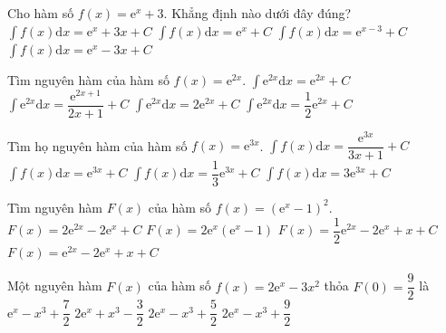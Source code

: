 \begin{ex}
	Cho hàm số $f(x)=\mathrm{e}^x+3$. Khẳng định nào dưới đây đúng?
	\choice 
	{\True $\displaystyle\int f(x) \mathrm{ d} x=\mathrm{e}^x+3 x+C$}
	{$\displaystyle\int f(x) \mathrm{ d} x=\mathrm{e}^x+C$}
	{$\displaystyle\int f(x) \mathrm{ d} x=\mathrm{e}^{x-3}+C$}
	{ $\displaystyle \int f(x) \mathrm{ d} x=\mathrm{e}^x-3 x+C$}
\end{ex}

\begin{ex}
	Tìm nguyên hàm của hàm số $f(x)=\mathrm{e}^{2x}$.
	\choice
	{$\displaystyle \int{\mathrm{e}^{2x}\mathrm{d}x}=\mathrm{e}^{2x}+C$}
	{$\displaystyle \int{\mathrm{e}^{2x}\mathrm{d}x}=\dfrac{\mathrm{e}^{2x+1}}{2x+1}+C$}
	{$\displaystyle \int{\mathrm{e}^{2x}\mathrm{d}x}=2\mathrm{e}^{2x}+C$}
	{\True $\displaystyle \int{\mathrm{e}^{2x}\mathrm{d}x}=\dfrac{1}{2}\mathrm{e}^{2x}+C$}
\end{ex}

\begin{ex}%
	Tìm họ nguyên hàm của hàm số $ f(x)=\mathrm{e}^{3x} $.
	\choice
	{$ \displaystyle\int f(x)\mathrm{d}x=\dfrac{\mathrm{e}^{3x}}{3x+1}+C $}
	{$ \displaystyle\int f(x)\mathrm{d}x=\mathrm{e}^{3x}+C $}
	{\True $ \displaystyle\int f(x)\mathrm{d}x=\dfrac{1}{3}\mathrm{e}^{3x}+C $}
	{$ \displaystyle\int f(x)\mathrm{d}x=3\mathrm{e}^{3x}+C $}
\end{ex}

\begin{ex}
	Tìm nguyên hàm $F(x)$ của hàm số $f(x)={\left(\mathrm{e}^x - 1\right)}^2$.
	\choice
	{$F(x)=2\mathrm{e}^{2x} - 2\mathrm{e}^x + C$}
	{$F(x)=2\mathrm{e}^x\left(\mathrm{e}^x - 1\right)$}
	{\True $F(x)=\dfrac{1}{2}\mathrm{e}^{2x} - 2\mathrm{e}^x + x + C$}
	{$F(x)=\mathrm{e}^{2x} - 2\mathrm{e}^x + x + C$}
\end{ex}

\begin{ex} %
	Một nguyên hàm $F(x)$ của hàm số $f(x)=2 \mathrm{e}^x-3x^2$ thỏa $F(0)=\dfrac{9}{2}$ là
	\choice
	{$\mathrm{e}^x-x^3+\dfrac{7}{2}$}
	{$2\mathrm{e}^x+x^3-\dfrac{3}{2}$}
	{\True $2 \mathrm{e}^x-x^3+\dfrac{5}{2}$}
	{$2\mathrm{e}^x-x^3+\dfrac{9}{2}$}
\end{ex}

